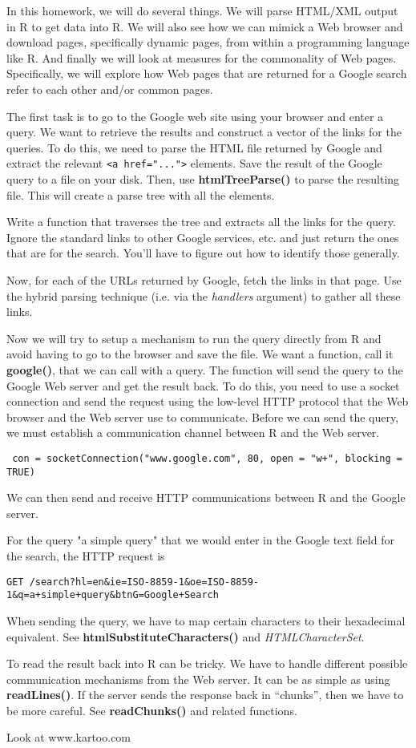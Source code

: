 \documentclass{article}
\def\SVariable#1{\textit{#1}}
\def\SFunction#1{\textbf{#1()}}
\def\SArg#1{\textsl{#1}}
\begin{document}
In this homework, we will do several things.
We will parse HTML/XML output in R to
get data into R.
We will also see how  we can mimick a Web browser
and download pages, specifically dynamic pages,
from within a programming language like R.
And finally we will look at measures
for the commonality of Web pages.
Specifically, we will explore how 
Web pages that are returned for a Google
search refer to each other and/or common pages.


The first task is to go to the Google
web site using your browser and enter a query.
We want to retrieve the results and
construct a vector of the links for
the queries.
To do this, we need to parse the HTML
file returned by Google and extract the relevant
\verb+<a href="...">+ elements.
Save the result of the Google query 
to a file on your disk.
Then, use 
\SFunction{htmlTreeParse}
to parse the resulting file.
This will create a parse tree 
with all the elements.


Write a function that traverses the tree
and extracts all the links for the query.
Ignore the standard links to other Google
services, etc. and just return the ones
that are for the search.
You'll have to figure out how to identify those
generally.

Now, for each of the URLs returned by Google,
fetch the links in that page.
Use the hybrid parsing technique (i.e. via the 
\SArg{handlers} argument) to 
gather all these links.


Now we will try to setup a mechanism
to run the query directly from R
and avoid having to go to the browser
and save the file.
We want a function, call it \SFunction{google}, that
we can call with a query.
The function will send the query to the Google
Web server and get the result back.
To do this, you need to
use a socket connection and send the
request using the low-level HTTP protocol
that the Web browser and the Web server 
use to communicate.
Before we can send the query, we must establish
a communication channel between R and the Web server.
\begin{verbatim}
 con = socketConnection("www.google.com", 80, open = "w+", blocking = TRUE)
\end{verbatim}
We can then send and receive HTTP communications
between R and the Google server.

For the query "a simple query" that we would enter in the
Google text field for the search, the HTTP request is
\begin{verbatim}
GET /search?hl=en&ie=ISO-8859-1&oe=ISO-8859-1&q=a+simple+query&btnG=Google+Search
\end{verbatim}
When sending the query, we have to map certain characters to their
hexadecimal equivalent.
See \SFunction{htmlSubstituteCharacters} and
\SVariable{HTMLCharacterSet}.

To read the result back into R can be tricky.
We have to handle different possible communication mechanisms
from the Web server.  It can be as simple as using
\SFunction{readLines}.
If the server sends the response back in ``chunks'',
then we have to be more careful.
See \SFunction{readChunks}
and related functions.





Look at www.kartoo.com
\end{document}
